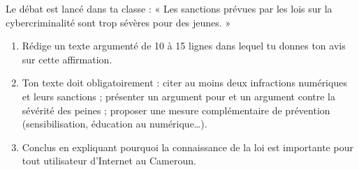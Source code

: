 \documentclass[11pt]{article}
\begin{document}
\begin{exercice}
Le débat est lancé dans ta classe : « Les sanctions prévues par les lois sur la cybercriminalité sont trop sévères pour des jeunes. »
\begin{enumerate}
\item Rédige un texte argumenté de 10 à 15 lignes dans lequel tu donnes ton avis sur cette affirmation.
\item Ton texte doit obligatoirement : citer au moins deux infractions numériques et leurs sanctions ; présenter un argument pour et un argument contre la sévérité des peines ; proposer une mesure complémentaire de prévention (sensibilisation, éducation au numérique\ldots).
\item Conclus en expliquant pourquoi la connaissance de la loi est importante pour tout utilisateur d'Internet au Cameroun.
\end{enumerate}
\end{exercice}
\end{document}
